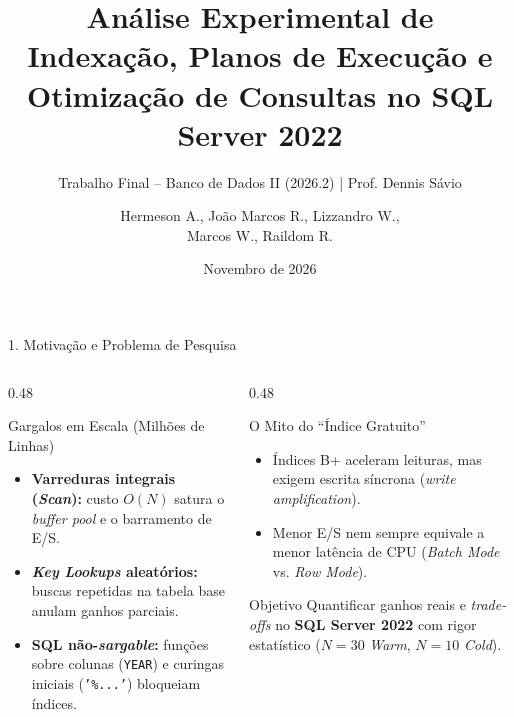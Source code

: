 \documentclass[aspectratio=169,11pt]{beamer}
\title[Indexação e Otimização no SQL Server 2022]{Análise Experimental de Indexação, Planos de Execução e Otimização de Consultas no SQL Server 2022}
\subtitle{Trabalho Final -- Banco de Dados II (2026.2) | Prof. Dennis Sávio}
\author[Hermeson A. et al.]{Hermeson A., João Marcos R., Lizzandro W.,\texorpdfstring{\\}{ }Marcos W., Raildom R.}
\institute[UFPI/CSHNB]{Bacharelado em Sistemas de Informação\\Universidade Federal do Piauí (UFPI) -- CSHNB -- Picos -- PI}
\date{Novembro de 2026}
\begin{document}
\begin{frame}
  \titlepage
\end{frame}

\begin{frame}{1. Motivação e Problema de Pesquisa}
  \begin{columns}[T]
    \begin{column}{0.48\textwidth}
      \begin{block}{Gargalos em Escala (Milhões de Linhas)}
        \begin{itemize}
          \item \textbf{Varreduras integrais (\textit{Scan}):} custo $O(N)$ satura o \textit{buffer pool} e o barramento de E/S.
          \item \textbf{\textit{Key Lookups} aleatórios:} buscas repetidas na tabela base anulam ganhos parciais.
          \item \textbf{SQL não-\textit{sargable}:} funções sobre colunas (\texttt{YEAR}) e curingas iniciais (\texttt{'\%...'}) bloqueiam índices.
        \end{itemize}
      \end{block}
    \end{column}
    \begin{column}{0.48\textwidth}
      \begin{alertblock}{O Mito do ``Índice Gratuito''}
        \begin{itemize}
          \item Índices B+ aceleram leituras, mas exigem escrita síncrona (\textit{write amplification}).
          \item Menor E/S nem sempre equivale a menor latência de CPU (\textit{Batch Mode} vs. \textit{Row Mode}).
        \end{itemize}
      \end{alertblock}
      \begin{exampleblock}{Objetivo}
        Quantificar ganhos reais e \textit{trade-offs} no \textbf{SQL Server 2022} com rigor estatístico ($N=30$ \textit{Warm}, $N=10$ \textit{Cold}).
      \end{exampleblock}
    \end{column}
  \end{columns}
\end{frame}
\end{document}
